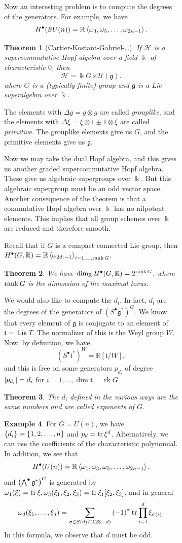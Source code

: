 \documentclass[leqno, openany]{memoir}
\newtheorem{thm}{Theorem}[section]
\theoremstyle{definition}
\newtheorem{exm}[thm]{Example}
\theoremstyle{remark}
\theoremstyle{plain}
\theoremstyle{definition}
\theoremstyle{remark}
\newcommand{\R}{\mathbb{R}}
\renewcommand{\k}{\Bbbk}
\newcommand{\mf}[1]{\mathfrak{#1}}
\DeclareMathOperator{\Lie}{\mathsf{Lie}}
\DeclareMathOperator{\rk}{rk}
\begin{document}
\begin{figure}[H]
\begin{figure}[H]
Now an interesting problem is to compute the degrees of the generators. For
example, we have \[ H^{\bullet}(SU(n)) = \R \ev{\omega_3, \omega_5, \ldots,
\omega_{2n-1}}. \]

\begin{thm}[Cartier-Kostant-Gabriel-\ldots] If $\mathcal{H}$ is a
    supercommutative Hopf algebra over a field $\k$ of characteristic $0$, then
    \[ \mathcal{H} = \k G \ltimes \mathcal{U}(\mf{g}). \] where $G$ is a
    (typically finite) group and $\mf{g}$ is a Lie superalgebra over $\k$.
\end{thm}

The elements with $\Delta g = g \otimes g$ are called \textit{grouplike}, and
the elements with $\Delta \xi = \xi \otimes 1 \pm 1 \otimes \xi$ are called
\textit{primitive}. The grouplike elements give us $G$, and the primitive
elements give us $\mf{g}$. 

Now we may take the dual Hopf algebra, and this gives us another graded
supercommutative Hopf algebra. These give us algebraic supergroups over $\k$.
But this algebraic supergroup must be an odd vector space. Another consequence
of the theorem is that a commutative Hopf algebra over $\k$ has no nilpotent
elements. This implies that all group schemes over $\k$ are reduced and
therefore smooth.

Recall that if $G$ is a compact connected Lie group, then $H^{\bullet}(G, \R) =
\R \ev{\omega_{2d_i - 1}}_{i = 1, \ldots, \rank G}$.

\begin{thm} We have $\dim_{\R} H^{\bullet}(G, \R) = 2^{\rank G}$, where $\rank
G$ is the dimension of the maximal torus.  \end{thm}

We would also like to compute the $d_i$. In fact, $d_i$ are the degrees of the
generators of ${ ( S^{\bullet} \mf{g}^* ) }^G$. We know that every element of
$\mf{g}$ is conjugate to an element of $\mf{t} = \Lie T$. The normalizer of
this is the Weyl group $W$. Now, by definition, we have \[ {(S^{\bullet}
\mf{t}^*)}^W = \R[\mf{t}/W], \] and this is free on some generators $p_{d_i}$
of degree $\abs{p_{d_i}} = d_i$ for $i = 1, \ldots, \dim \mf{t} = \rk G$.

\begin{thm} The $d_i$ defined in the various ways are the same numbers and are
called \textit{exponents} of $G$.  \end{thm}

\begin{exm} For $G = U(n)$, we have $\qty{d_i} = \qty{1, 2, \ldots, n}$ and
    $p_d = \tr \xi^d$. Alternatively, we can use the coefficients of the
    characteristic polynomial. In addition, we see that \[ H^{\bullet}(U(n)) =
    \R \ev{\omega_1, \omega_3, \omega_5, \ldots, \omega_{2n-1}}, \] and
    ${\qty(\bigwedge^{\bullet} \mf{g}^*)}^G$ is generated by $\omega_1(\xi) =
    \tr \xi, \omega_3 (\xi_1, \xi_2, \xi_3) = \tr \xi_1 [\xi_2, \xi_3]$, and in
    general \[ \omega_d(\xi_1, \ldots, \xi_d) = \sum_{\sigma \in S(d) /
    (123\ldots d)} {(-1)}^{\sigma} \tr \prod_{i=1}^d \xi_{\sigma(i)}. \] In
this formula, we observe that $d$ must be odd.  \end{exm}


\end{figure}
\end{figure}
\end{document}
